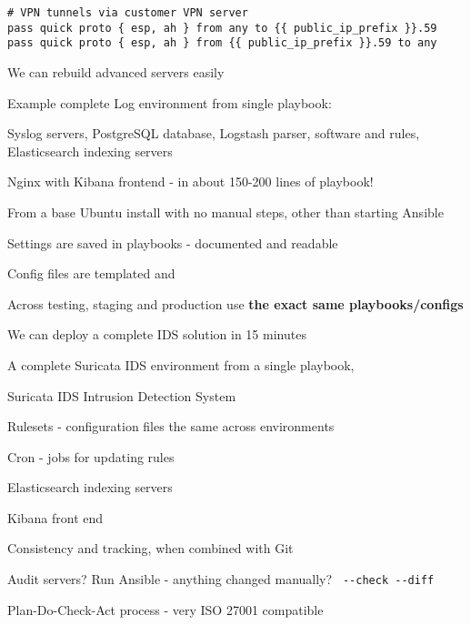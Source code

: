 \documentclass[17pt,Screen16to9,footrule]{foils}
\begin{document}

{\small\begin{verbatim}
# VPN tunnels via customer VPN server
pass quick proto { esp, ah } from any to {{ public_ip_prefix }}.59
pass quick proto { esp, ah } from {{ public_ip_prefix }}.59 to any
\end{verbatim}}


\begin{list1}
\item We can rebuild advanced servers easily
\item Example complete Log environment from single playbook:
\begin{list2}
\item Syslog servers, PostgreSQL database, Logstash parser, software and rules, Elasticsearch indexing servers
\item Nginx with Kibana frontend - in about 150-200 lines of playbook!
\item From a base Ubuntu install with no manual steps, other than starting Ansible
\end{list2}
\item Settings are saved in playbooks - documented and readable
\item Config files are templated and
\item Across testing, staging and production use {\bf the exact same playbooks/configs}
\end{list1}



\begin{list1}
\item We can deploy a complete IDS solution in 15 minutes
\item A complete Suricata IDS environment from a single playbook,
\begin{list2}
\item Suricata IDS Intrusion Detection System
\item Rulesets - configuration files the same across environments
\item Cron - jobs for updating rules
\item Elasticsearch indexing servers
\item Kibana front end
\end{list2}
\item Consistency and tracking, when combined with Git
\item Audit servers? Run Ansible - anything changed manually? \verb$ --check --diff$
\vskip 5mm
\item Plan-Do-Check-Act process - very ISO 27001 compatible
\end{list1}
\end{document}
